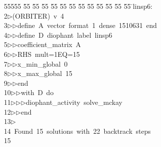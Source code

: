%
%
\begin{tabbing}
55555 \= 55 \= 55 \= 55 \= 55 \= 55 \= 55 \= 55 \= 55 \= 55 \= 55 \= 55 \= 55 \= \>linsp6:\\[0pt]
2\>$\triangleright$\>(ORBITER)\ v\ 4\ \\[0pt]
3\>$\triangleright$\>$\triangleright$\>define\ A\ vector\ format\ 1\ dense\ 1510631\ end\ \\[0pt]
4\>$\triangleright$\>$\triangleright$\>define\ D\ diophant\ label\ linsp6\ \\[0pt]
5\>$\triangleright$\>$\triangleright$\>coefficient\_matrix\ A\ \\[0pt]
6\>$\triangleright$\>$\triangleright$\>RHS\ mult=1EQ=15\ \\[0pt]
7\>$\triangleright$\>$\triangleright$\>x\_min\_global\ 0\ \\[0pt]
8\>$\triangleright$\>$\triangleright$\>x\_max\_global\ 15\ \\[0pt]
9\>$\triangleright$\>$\triangleright$\>end\ \\[0pt]
10\>$\triangleright$\>$\triangleright$\>with\ D\ do\ \\[0pt]
11\>$\triangleright$\>$\triangleright$\>$\triangleright$\>diophant\_activity\ solve\_mckay\ \\[0pt]
12\>$\triangleright$\>$\triangleright$\>end\\[0pt]
13\>$\triangleright$\>\\[0pt]
14\>\ Found\ 15\ solutions\ with\ 22\ backtrack\ steps\\[0pt]
15\>\end{tabbing}

